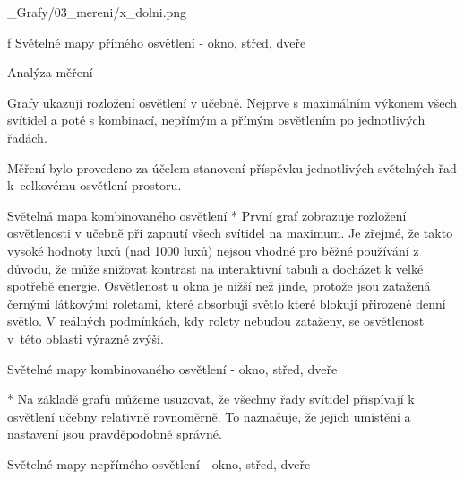 \medskip {}
\picw=15cm _Grafy/03_mereni/x_dolni.png
\caption/f Světelné mapy přímého osvětlení - okno, střed, dveře
\medskip


\secc Analýza měření

Grafy ukazují rozložení osvětlení v učebně. Nejprve s maximálním výkonem všech svítidel a poté s kombinací,
nepřímým a přímým osvětlením po jednotlivých řadách.



Měření bylo provedeno za účelem stanovení příspěvku jednotlivých světelných řad k~celkovému osvětlení prostoru.

\medskip {} Světelná mapa kombinovaného osvětlení
\begitems
  * První graf zobrazuje rozložení osvětlenosti v učebně při zapnutí všech svítidel na maximum. Je zřejmé, že takto vysoké hodnoty luxů
    (nad 1000 luxů) nejsou vhodné pro běžné používání z důvodu, že může snižovat kontrast na interaktivní tabuli a docházet k velké 
    spotřebě energie. 
    Osvětlenost u okna je nižší než jinde, protože jsou zatažená černými látkovými roletami,
    které absorbují světlo které blokují přirozené denní světlo.
    V reálných podmínkách, kdy rolety nebudou zataženy, se osvětlenost v~této oblasti výrazně zvýší.
\enditems


\medskip {} Světelné mapy kombinovaného osvětlení - okno, střed, dveře


\begitems
    * Na základě grafů můžeme usuzovat, že všechny řady svítidel přispívají k osvětlení učebny relativně rovnoměrně.
        To naznačuje, že jejich umístění a nastavení jsou pravděpodobně správné.
\enditems

\medskip {} Světelné mapy nepřímého osvětlení - okno, střed, dveře

